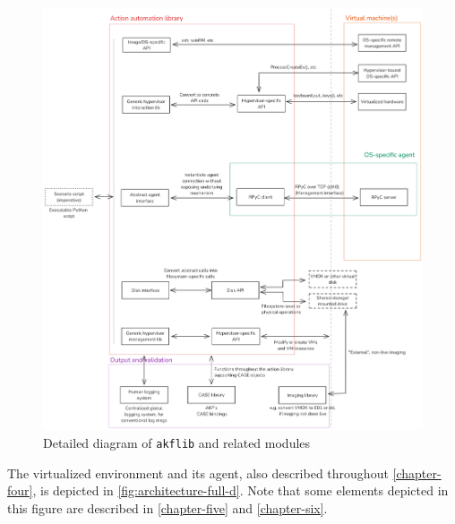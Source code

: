\documentclass[letterpaper,12pt]{report}
\newcommand{\passthrough}[1]{#1}
\begin{document}
\begin{figure}[h]
\centering
\includegraphics[width=1\linewidth]{architecture-full-b.png}
\caption{Detailed diagram of \passthrough{\lstinline!akflib!} and
related modules}\label{fig:architecture-full-b}
\end{figure}

The virtualized environment and its agent, also described throughout
\autoref{chapter-four}, is depicted in
\autoref{fig:architecture-full-d}. Note that some elements depicted in
this figure are described in \autoref{chapter-five} and
\autoref{chapter-six}.
\end{document}
